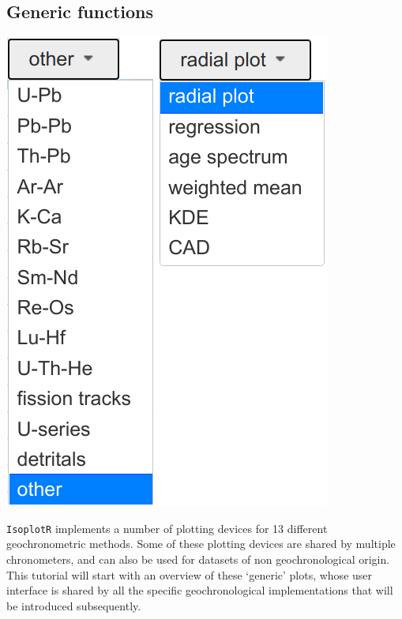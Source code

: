\begin{refsection}

\chapter{Generic functions}
\label{ch:generic-R}

\noindent\begin{minipage}[t]{.3\linewidth}
\strut\vspace*{-\baselineskip}\newline
\includegraphics[width=\linewidth]{../figures/OtherMethodsPlotdevices.png}\\
\end{minipage}
\begin{minipage}[t]{.7\textwidth}
  \texttt{IsoplotR} implements a number of plotting devices for 13
  different geochronometric methods. Some of these plotting devices
  are shared by multiple chronometers, and can also be used for
  datasets of non geochronological origin. This tutorial will start
  with an overview of these `generic' plots, whose user interface is
  shared by all the specific geochronological implementations that
  will be introduced subsequently.
\end{minipage}


\end{refsection}
